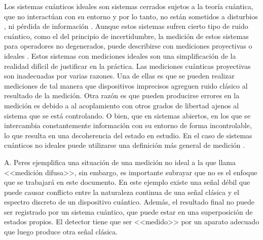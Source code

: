Los sistemas cuánticos ideales son sistemas cerrados sujetos a la teoría
cuántica, que no interactúan con su entorno y por lo tanto, no están sometidos
a disturbios , ni pérdida de información . Aunque estos sistemas sufren cierto
tipo de ruido cuántico, como el del principio de incertidumbre, la medición de
estos sistemas para operadores no degenerados, puede describirse con mediciones
proyectivas o ideales . Estos sistemas con mediciones ideales son una
simplificación de la realidad difícil de justificar en la práctica. Las
mediciones cuánticas proyectivas son inadecuadas por varias razones. Una de
ellas es que se pueden realizar mediciones de tal manera que dispositivos
imprecisos agreguen ruido clásico al resultado de la medición. Otra razón es
que pueden producirse errores en la medición es debido a al acoplamiento con
otros grados de libertad ajenos al sistema que se está controlando. O bien, que
en sistemas abiertos, en los que se intercambia constantemente información con
su entorno de forma incontrolable, lo que resulta en una decoherencia del
estado en estudio. En el
caso de sistemas cuánticos no ideales puede utilizarse
una definición más general de medición {\cite{wilde2011classical,
jaeger2007quantum}}. 



A. Peres {\cite{peres1997quantum}} ejemplifica una situación de una medición no
ideal a la que llama <<medición difusa>>, sin embargo, es importante subrayar
que no es el enfoque que se trabajará en este documento. En este ejemplo existe
una señal débil que puede causar conflicto entre la naturaleza continua de una
señal clásica y el espectro discreto de un dispositivo cuántico. Además, el
resultado final no puede ser registrado por un sistema cuántico, que puede
estar en una superposición de estados propios. El detector tiene que ser
<<medido>> por un aparato adecuado que luego produce otra señal clásica.

